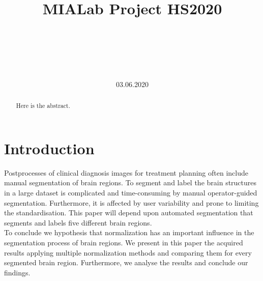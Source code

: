 \documentclass[journal]{IEEEtran}
\begin{document}

\title{MIALab Project HS2020}


\author{
\\
\and
{}
\\
\and
{}
\\
}
\date{03.06.2020}

\maketitle
\pagestyle{plain}
\newpage



\begin{abstract}
Here is the abstract.


\end{abstract}




\section{Introduction}

	Postprocesses of clinical diagnosis images for treatment planning often include manual segmentation of brain regions. 
	To segment and label the brain structures in a large dataset is complicated and time-consuming by manual operator-guided segmentation. 
	Furthermore, it is affected by user variability and prone to limiting the standardisation. 
	This paper will depend upon automated segmentation that segments and labels five different brain regions. \\


	To conclude we hypothesis that normalization has an important influence in the segmentation process of brain regions. 
	We present in this paper the acquired results applying multiple normalization methods and comparing them for every segmented brain region. 
	Furthermore, we analyse the results and conclude our findings. \\
\end{document}
